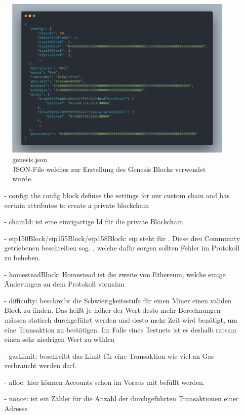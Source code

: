 \begin{figure}[th!]
	\centering
	\includegraphics[width=.9\columnwidth]{./Abbildungen/Kapitel_03/genesis.json.png}
	\caption{
		genesis.json\\
		JSON-File welches zur Erstellung des Genesis Blocks verwendet wurde.
	}
	\label{img:gen}
\end{figure}

\begin{itemize}
	\item[-] config: the config block defines the settings for our custom chain and has certain attributes to create a private blockchain
	      	      	      	 
	\item[-] chainId: ist eine einzigartige Id für die private Blockchain
	      	      	      
	\item[-] eip150Block/eip155Block/eip158Block: eip steht für . Diese drei Community getriebenen  beschreiben sog. , welche dafür sorgen sollten Fehler im Protokoll zu beheben. 
	      	      	      
	\item[-] homesteadBlock: Homestead ist die zweite  von Ethereum, welche einige Änderungen an dem Protokoll vornahm
	      	      	      	
	\item[-] difficulty: beschreibt die Schwierigkeitsstufe für einen Miner einen validen Block zu finden. Das heißt je höher der Wert desto mehr Berechnungen müssen statisch durchgeführt werden und desto mehr Zeit wird benötigt, um eine Transaktion zu bestätigen. Im Falle eines Testnets ist es deshalb ratsam einen sehr niedrigen Wert zu wählen
	      	      	      	
	\item[-] gasLimit: beschreibt das Limit für eine Transaktion wie viel an Gas verbraucht werden darf. 
	      	      	      
	\item[-] alloc: hier können Accounts schon im Voraus mit  befüllt werden.
	\item[-] nonce: ist ein Zähler für die Anzahl der durchgeführten Transaktionen einer Adresse
\end{itemize}

